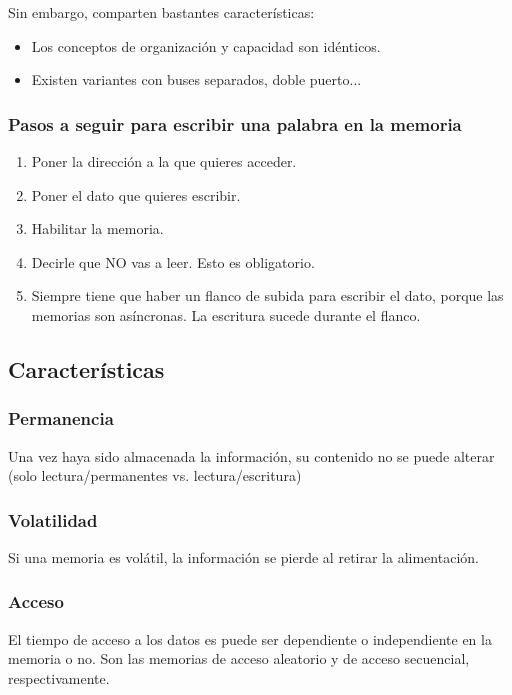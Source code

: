 \documentclass[a4paper]{book}
\begin{document}
Sin embargo, comparten bastantes características:
\begin{itemize}
	 \item Los conceptos de organización y capacidad son idénticos.
	 \item Existen variantes con buses separados, doble puerto...
\end{itemize}

\subsubsection{Pasos a seguir para escribir una palabra en la memoria}
\begin{enumerate}
	 \item Poner la dirección a la que quieres acceder.
	 \item Poner el dato que quieres escribir.
	 \item Habilitar la memoria.
	 \item Decirle que NO vas a leer. Esto es obligatorio.
	 \item Siempre tiene que haber un flanco de subida para escribir el dato, porque las memorias son asíncronas. La escritura sucede durante el flanco.
\end{enumerate}

\subsection{Características}

\subsubsection{Permanencia}

Una vez haya sido almacenada la información, su contenido no se puede alterar (solo lectura/permanentes vs. lectura/escritura)

\subsubsection{Volatilidad}

Si una memoria es volátil, la información se pierde al retirar la alimentación.

\subsubsection{Acceso}

El tiempo de acceso a los datos es puede ser dependiente o independiente en la memoria o no. Son las memorias de acceso aleatorio y de acceso secuencial, respectivamente.
\end{document}
